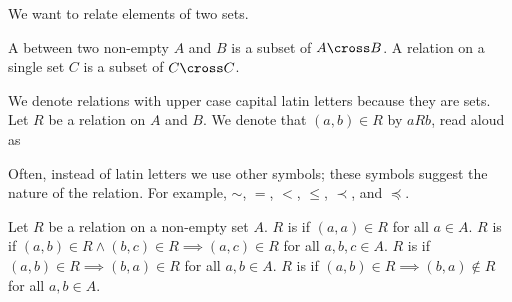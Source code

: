 
\sbasic




\sstart


We want to relate elements
of two sets.



A
between two non-empty
$A$ and $B$ is a subset of
$A \cross B$.
A relation on a single set
$C$ is a subset of $C \cross C$.

We denote relations with upper
case capital latin letters because
they are sets.
Let $R$ be a relation on $A$ and $B$.
We denote that $(a, b) \in R$ by
$a R b$, read aloud as

Often, instead of latin letters we use
other symbols; these symbols suggest the
nature of the relation.
For example,
$\sim$, $=$, $<$,
$\leq$, $\prec$, and $\preceq$.


Let $R$ be a relation on
a non-empty set $A$.
$R$ is  if
$(a, a) \in R$ for all $a \in A$.
$R$ is  if
$(a, b) \in R \land (b, c) \in R \implies (a, c) \in R$
for all $a, b, c \in A$.
$R$ is  if
$(a, b) \in R \implies (b, a) \in R$
for all $a, b \in A$.
$R$ is  if
$(a, b) \in R \implies (b, a) \not\in R$ for all $a, b \in A$.

\strats
